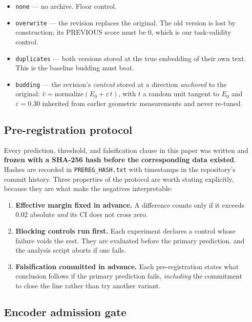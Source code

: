 \documentclass[11pt,a4paper]{article}
\begin{document}
\begin{itemize}
\item \texttt{none} --- no archive. Floor control.
\item \texttt{overwrite} --- the revision replaces the original. The old version is lost by
      construction; its PREVIOUS score must be $0$, which is our task-validity control.
\item \texttt{duplicates} --- both versions stored at the true embedding of their own text. This is
      the baseline budding must beat.
\item \texttt{budding} --- the revision's \emph{content} stored at a direction \emph{anchored} to the
      original: $\hat{v} = \mathrm{normalize}(E_0 + \varepsilon\, t)$, with $t$ a random unit tangent
      to $E_0$ and $\varepsilon = 0.30$ inherited from earlier geometric measurements and never
      re-tuned.
\end{itemize}

\subsection{Pre-registration protocol}

Every prediction, threshold, and falsification clause in this paper was written and \textbf{frozen
with a SHA-256 hash before the corresponding data existed}. Hashes are recorded in
\texttt{PREREG\_HASH.txt} with timestamps in the repository's commit history. Three properties of the
protocol are worth stating explicitly, because they are what make the negatives interpretable:

\begin{enumerate}
\item \textbf{Effective margin fixed in advance.} A difference counts only if it exceeds $0.02$
      absolute \emph{and} its CI does not cross zero.
\item \textbf{Blocking controls run first.} Each experiment declares a control whose failure voids
      the rest. They are evaluated before the primary prediction, and the analysis script aborts if
      one fails.
\item \textbf{Falsification committed in advance.} Each pre-registration states what conclusion
      follows if the primary prediction fails, \emph{including} the commitment to close the line
      rather than try another variant.
\end{enumerate}

\subsection{Encoder admission gate}
\label{sec:gate}
\end{document}
